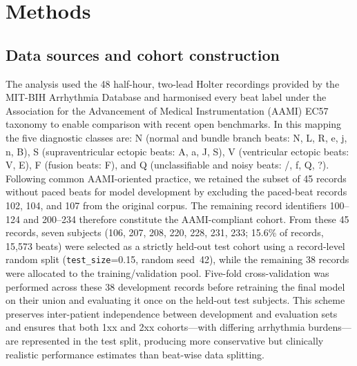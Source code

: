 \section{Methods}
\subsection{Data sources and cohort construction}
The analysis used the 48 half-hour, two-lead Holter recordings provided by the MIT-BIH Arrhythmia Database and harmonised every beat label under the Association for the Advancement of Medical Instrumentation (AAMI) EC57 taxonomy to enable comparison with recent open benchmarks.\cite{Goldberger2000PhysioBank,luz2016ecg} In this mapping the five diagnostic classes are: N (normal and bundle branch beats: N, L, R, e, j, n, B), S (supraventricular ectopic beats: A, a, J, S), V (ventricular ectopic beats: V, E), F (fusion beats: F), and Q (unclassifiable and noisy beats: /, f, Q, ?). Following common AAMI-oriented practice, we retained the subset of 45 records without paced beats for model development by excluding the paced-beat records 102, 104, and 107 from the original corpus.\cite{moody2001impact} The remaining record identifiers 100--124 and 200--234 therefore constitute the AAMI-compliant cohort. From these 45 records, seven subjects (106, 207, 208, 220, 228, 231, 233; 15.6\% of records, 15{,}573 beats) were selected as a strictly held-out test cohort using a record-level random split (\texttt{test\_size}=0.15, random seed~42), while the remaining 38 records were allocated to the training/validation pool. Five-fold cross-validation was performed across these 38 development records before retraining the final model on their union and evaluating it once on the held-out test subjects. This scheme preserves inter-patient independence between development and evaluation sets and ensures that both 1xx and 2xx cohorts---with differing arrhythmia burdens---are represented in the test split, producing more conservative but clinically realistic performance estimates than beat-wise data splitting.

